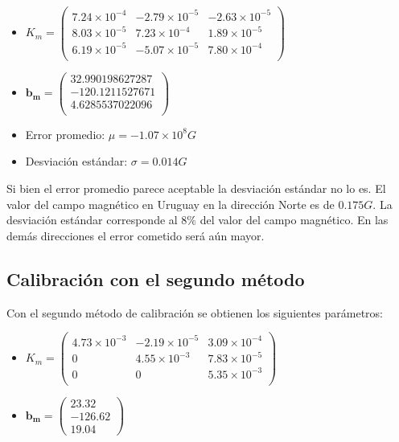 \documentclass[main]{subfiles}
\begin{document}
\begin{itemize}
\item $K_m=\left(\begin{array}{ccc}
      7.24\times10^{-4}   &  -2.79\times10^{-5}  &   -2.63\times10^{-5}\\
      8.03\times10^{-5}   &  7.23\times10^{-4}   &   1.89\times10^{-5}\\
      6.19\times10^{-5}   &  -5.07\times10^{-5}  &    7.80\times10^{-4}\\
	
\end{array}  \right)$
\item $\mathbf{b_m}= \left( \begin{array}{c}
  32.990198627287\\
           -120.1211527671\\
           4.6285537022096\\
\end{array}\right)
$
\item Error promedio: $ \mu = -1.07\times10^{8} G$\\
\item Desviación estándar: $\sigma =0.014 G$
\end{itemize}

Si bien el error promedio parece aceptable la desviación estándar no lo es. El valor del campo magnético en Uruguay en la dirección Norte es de $0.175 G$. La desviación estándar corresponde al $8\%$ del valor del campo magnético. En las demás direcciones el error cometido será aún mayor.\\


\subsection{Calibración con el segundo método}
Con el segundo método de calibración se obtienen los siguientes parámetros:
\begin{itemize}


\item $K_m=\left( \begin{array}{ccc}
 4.73\times10^{-3}   &  -2.19\times10^{-5}    &  3.09\times10^{-4} \\
                         0      & 4.55\times10^{-3}   &   7.83\times10^{-5} \\
                         0     &                    0   &    5.35\times10^{-3} \\
\end{array}
\right)
$

\item $
\mathbf{b_m}=\left(\begin{array}{c}
	23.32\\
	-126.62\\
    19.04
\end{array}\right)
$
\end{itemize}
\end{document}

